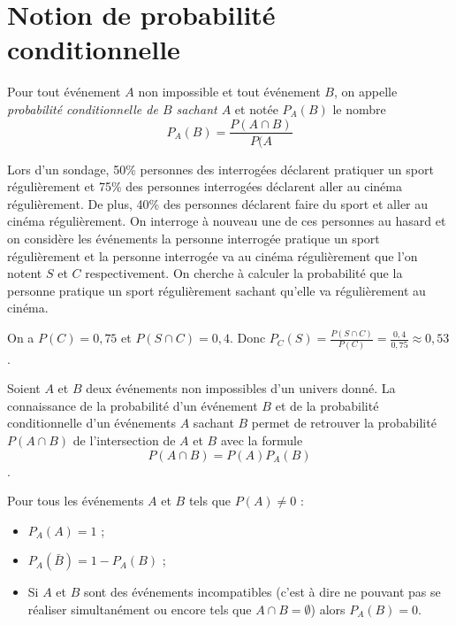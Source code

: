 \documentclass[french]{book}
\begin{document}
\section{Notion de probabilité conditionnelle}


\begin{defn}
Pour tout événement $A$ non impossible et tout événement $B$, on appelle \emph{probabilité conditionnelle de $B$ sachant $A$} et notée $P_A(B)$ le nombre $$P_A(B)=\frac{P(A\cap B)}{P(A}$$
\end{defn}

\begin{exemple}
Lors d'un sondage, 50\% personnes des interrogées déclarent pratiquer un sport régulièrement et 75\% des
personnes interrogées déclarent aller au cinéma régulièrement. De plus, 40\% des personnes déclarent faire du sport et aller au cinéma régulièrement. On interroge à nouveau une de ces personnes au hasard et on considère les événements \og{}la personne interrogée pratique un sport régulièrement\fg{} et \og{}la personne interrogée va au cinéma régulièrement\fg{} que l'on notent $S$ et $C$ respectivement.
On cherche à calculer la probabilité que la personne pratique un sport régulièrement sachant qu'elle va régulièrement au cinéma.

On a $P(C)=0,75$ et $P(S\cap C)=0,4$. Donc $P_C(S)=\frac{P(S\cap C)}{P(C)}=\frac{0,4}{0,75}\approx 0,53$.
\end{exemple}


\begin{prop}
Soient $A$ et $B$ deux événements non impossibles d'un univers donné. La connaissance de la probabilité d'un événement $B$ et de la probabilité conditionnelle d'un événements $A$ sachant $B$ permet de retrouver la probabilité $P(A\cap B)$ de l'intersection de $A$ et $B$ avec la formule $$P(A\cap B)=P(A)P_A(B)$$.
\end{prop}


\begin{prop}
Pour tous les événements $A$ et $B$ tels que $P(A)\neq 0$ :
\begin{itemize}
\item[$\bullet$] $P_A(A)=1$ ;
\item[$\bullet$] $P_A(\bar{B})=1-P_A(B)$ ;
\item[$\bullet$] Si $A$ et $B$ sont des événements incompatibles (c'est à dire ne pouvant pas se réaliser simultanément ou encore tels que $A\cap B=\emptyset$) alors $P_A(B)=0$.
\end{itemize}
\end{prop}
\end{document}
